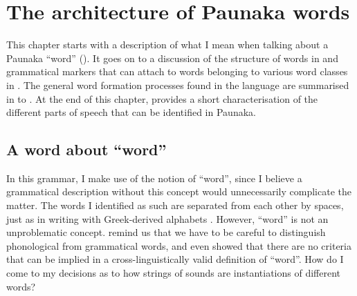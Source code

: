 
\chapter{The architecture of Paunaka words}\label{chap:Architecture}

This chapter starts with a description of what I mean when talking about a Paunaka “word” (). It goes on to a discussion of the structure of words in  and grammatical markers that can attach to words belonging to various word classes in . The general word formation processes found in the language are summarised in  to . At the end of this chapter,  provides a short characterisation of the different parts of speech that can be identified in Paunaka.

\section{A word about “word”}\label{sec:Word}

In this grammar, I make use of the notion of “word”, since I believe a grammatical description without this concept would unnecessarily complicate the matter. The words I identified as such are separated from each other by spaces, just as in writing with Greek-derived alphabets \citep[33]{Haspelmath2011}. However, “word” is not an unproblematic concept. \citet[]{DixAikh2003} remind us that we have to be careful to distinguish phonological from grammatical words, and \citet[]{Haspelmath2011} even showed that there are no criteria that can be implied in a cross-linguistically valid definition of “word”. How do I come to my decisions as to how strings of sounds are instantiations of different words?


